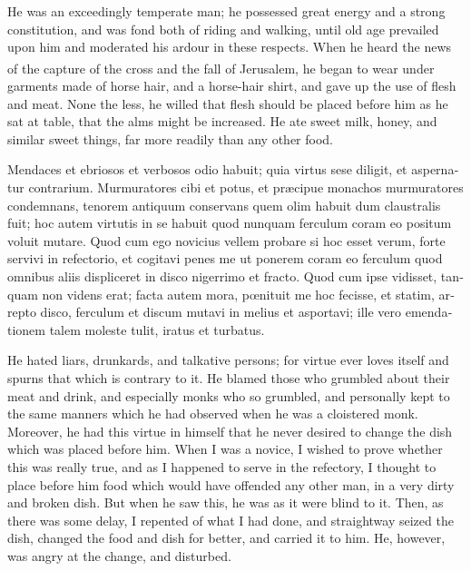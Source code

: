 \documentclass{book}
\newcounter{engnote}
\newcommand{\engnotenum}{\textsuperscript{\arabic{engnote}\stepcounter{engnote}}}
\begin{document}
\begin{paracol}{2}
\switchcolumn

He was an exceedingly temperate man; he possessed great energy and a strong constitution, and was fond both of riding and walking, until old age prevailed upon him and moderated his ardour in these respects. When he heard the news of the capture of the cross and the fall of Jerusalem,\engnotenum{} he began to wear under garments made of horse hair, and a horse-hair shirt, and gave up the use of flesh and meat. None the less, he willed that flesh should be placed before him as he sat at table, that the alms might be increased. He ate sweet milk, honey, and similar sweet things, far more readily than any other food.

\switchcolumn*

\begin{otherlanguage}{latin}
Mendaces et ebriosos et verbosos odio habuit; quia virtus sese diligit, et aspernatur contrarium. Murmuratores cibi et potus, et pr\ae{}cipue monachos murmuratores condemnans, tenorem antiquum conservans quem olim habuit dum claustralis fuit; hoc autem virtutis in se habuit quod nunquam ferculum coram eo positum voluit mutare. Quod cum ego novicius vellem probare si hoc esset verum, forte servivi in refectorio, et cogitavi penes me ut ponerem coram eo ferculum quod omnibus aliis displiceret in disco nigerrimo et fracto. Quod cum ipse vidisset, tanquam non videns erat; facta autem mora, p\oe{}nituit me hoc fecisse, et statim, arrepto disco, ferculum et discum mutavi in melius et asportavi; ille vero emendationem talem moleste tulit, iratus et turbatus.
\end{otherlanguage}

\switchcolumn

He hated liars, drunkards, and talkative persons; for virtue ever loves itself and spurns that which is contrary to it. He blamed those who grumbled about their meat and drink, and especially monks who so grumbled, and personally kept to the same manners which he had observed when he was a cloistered monk. Moreover, he had this virtue in himself that he never desired to change the dish which was placed before him. When I was a novice, I wished to prove whether this was really true, and as I happened to serve in the refectory, I thought to place before him food which would have offended any other man, in a very dirty and broken dish. But when he saw this, he was as it were blind to it. Then, as there was some delay, I repented of what I had done, and straightway seized the dish, changed the food and dish for better, and carried it to him. He, however, was angry at the change, and disturbed.


\end{paracol}
\end{document}
